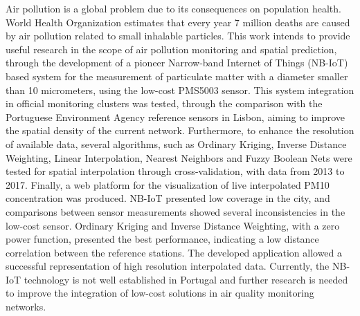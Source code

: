 \noindent 
Air pollution is a global problem due to its consequences on population health. World Health Organization estimates that every year 7 million deaths are caused by air pollution related to small inhalable particles. This work intends to provide useful research in the scope of air pollution monitoring and spatial prediction, through the development of a pioneer Narrow-band Internet of Things (NB-IoT) based system for the measurement of particulate matter with a diameter smaller than 10 micrometers, using the low-cost PMS5003 sensor. This system integration in official monitoring clusters was tested, through the comparison with the Portuguese Environment Agency reference sensors in Lisbon, aiming to improve the spatial density of the current network. Furthermore, to enhance the resolution of available data, several algorithms, such as Ordinary Kriging, Inverse Distance Weighting, Linear Interpolation, Nearest Neighbors and Fuzzy Boolean Nets were tested for spatial interpolation through cross-validation, with data from 2013 to 2017. Finally, a web platform for the visualization of live interpolated PM10 concentration was produced. NB-IoT presented low coverage in the city, and comparisons between sensor measurements showed several inconsistencies in the low-cost sensor. Ordinary Kriging and Inverse Distance Weighting, with a zero power function, presented the best performance, indicating a low distance correlation between the reference stations. The developed application allowed a successful representation of high resolution interpolated data. Currently, the NB-IoT technology is not well established in Portugal and further research is needed to improve the integration of low-cost solutions in air quality monitoring networks.


